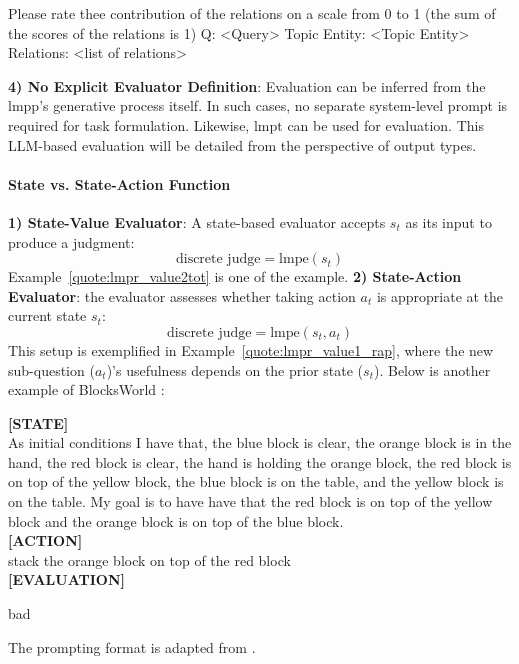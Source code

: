 \begin{numberedquote}
Please rate thee contribution of the relations on a scale from 0 to 1 (the sum of the scores of the relations is 1)
    \newline
    Q: <Query>
    \newline
    Topic Entity: <Topic Entity>
    \newline
    Relations: <list of relations>
\label{quote:lmpr_think_in_graph}
\end{numberedquote}
\textbf{4) No Explicit Evaluator Definition}:
Evaluation can be inferred from the $\text{lmpp}$’s generative process itself. In such cases, no separate system-level prompt is required for task formulation.
Likewise, $\text{lmpt}$ can be used for evaluation. This LLM-based evaluation will be detailed from the perspective of output types.

\paragraph{State vs. State-Action Function}
\textbf{1) State-Value Evaluator}:
A state-based evaluator accepts $s_t$ as its input to produce a judgment:
\begin{equation}
    \text{discrete judge} = \text{lmpe}(s_{t})
\end{equation}
Example~\ref{quote:lmpr_value2tot} is one of the example.
\textbf{2) State-Action Evaluator}:
the evaluator assesses whether taking action $a_t$ is appropriate at the current state $s_{t}$:
\begin{equation}
    \text{discrete judge} = \text{lmpe}(s_t, a_t)
\end{equation}
This setup is exemplified in Example~\ref{quote:lmpr_value1_rap}, where the new sub-question ($a_t$)’s usefulness depends on the prior state ($s_{t}$). Below is another example of BlocksWorld \citep{SLANEY2001119}: 
\begin{numberedquote}
    \textbf{[STATE]} \\
    As initial conditions I have that, the blue block is clear, the orange block is in the hand, the red block is clear, the hand is holding the orange block, the red block is on top of the yellow block, the blue block is on the table, and the yellow block is on the table.
    My goal is to have have that the red block is on top of the yellow block and the orange block is on top of the blue block. \\
    \textbf{[ACTION]} \\
    stack the orange block on top of the red block \\
    \textbf{[EVALUATION]}
    \begin{myshadowbox}
    bad
    \end{myshadowbox}
\label{quote:lmpr_value4rap}
\end{numberedquote}
The prompting format is adapted from \citet{hao-etal-2023-reasoning}.

